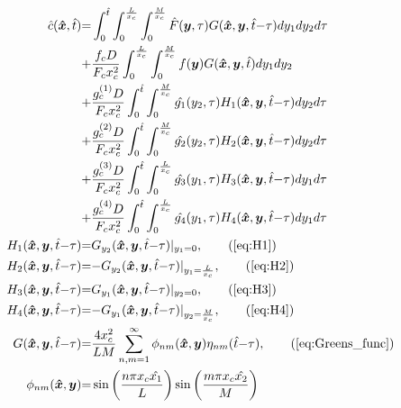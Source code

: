 \documentclass[\main/thesis.tex]{subfiles}
\begin{document}
\begin{align}
\hat{c}(\boldsymbol{\hat{x}}, \hat{t}) &{=} \int_{0}^{\hat{t}} \int_{0}^{\frac{L}{x_c}} \int_{0}^{\frac{M}{x_c}} \hat{F}(\boldsymbol{y}, \tau) G(\boldsymbol{\hat{x}}, \boldsymbol{y}, \hat{t}{-}\tau) dy_1 dy_2 d\tau \nonumber\\
               &{+} \frac{f_c D}{F_c x_c^2} \int_{0}^{\frac{L}{x_c}} \int_{0}^{\frac{M}{x_c}} f(\boldsymbol{y}) G(\boldsymbol{\hat{x}}, \boldsymbol{y}, \hat{t}) dy_1 dy_2 \nonumber\\
               &{+} \frac{g_c^{(1)} D}{F_c x_c^2} \int_{0}^{\hat{t}} \int_{0}^{\frac{M}{x_c}} \hat{g_1}(y_2, \tau) H_1(\boldsymbol{\hat{x}}, \boldsymbol{y}, \hat{t}{-}\tau) dy_2 d\tau \label{eq:carcin_sol}\\
               &{+} \frac{g_c^{(2)} D}{F_c x_c^2} \int_{0}^{\hat{t}} \int_{0}^{\frac{M}{x_c}} \hat{g_2}(y_2, \tau) H_2(\boldsymbol{\hat{x}}, \boldsymbol{y}, \hat{t}{-}\tau) dy_2 d\tau \nonumber\\
               &{+} \frac{g_c^{(3)} D}{F_c x_c^2} \int_{0}^{\hat{t}} \int_{0}^{\frac{L}{x_c}} \hat{g_3}(y_1, \tau) H_3(\boldsymbol{\hat{x}}, \boldsymbol{y}, \hat{t}{-}\tau) dy_1 d\tau \nonumber\\
               &{+} \frac{g_c^{(4)} D}{F_c x_c^2} \int_{0}^{\hat{t}} \int_{0}^{\frac{L}{x_c}} \hat{g_4}(y_1, \tau) H_4(\boldsymbol{\hat{x}}, \boldsymbol{y}, \hat{t}{-}\tau) dy_1 d\tau \nonumber\\
H_1(\boldsymbol{\hat{x}}, \boldsymbol{y}, \hat{t}{-}\tau) &{=} G_{y_2}(\boldsymbol{\hat{x}}, \boldsymbol{y}, \hat{t}{-}\tau) |_{y_1{=}0}, \tag{\ref{eq:H1}}\\
H_2(\boldsymbol{\hat{x}}, \boldsymbol{y}, \hat{t}{-}\tau) &{=} {-} G_{y_2}(\boldsymbol{\hat{x}}, \boldsymbol{y}, \hat{t}{-}\tau) |_{y_1{=}\frac{L}{x_c}}, \tag{\ref{eq:H2}}\\
H_3(\boldsymbol{\hat{x}}, \boldsymbol{y}, \hat{t}{-}\tau) &{=} G_{y_1}(\boldsymbol{\hat{x}}, \boldsymbol{y}, \hat{t}{-}\tau) |_{y_2{=}0}, \tag{\ref{eq:H3}}\\
H_4(\boldsymbol{\hat{x}}, \boldsymbol{y}, \hat{t}{-}\tau) &{=} {-} G_{y_1}(\boldsymbol{\hat{x}}, \boldsymbol{y}, \hat{t}{-}\tau) |_{y_2{=}\frac{M}{x_c}}, \tag{\ref{eq:H4}}\\
G(\boldsymbol{\hat{x}}, \boldsymbol{y}, \hat{t}{-}\tau) &{=} \frac{4 x_c^2}{LM} \sum_{n, m {=} 1}^{\infty} \phi_{nm}(\boldsymbol{\hat{x}}, \boldsymbol{y}) \eta_{nm}(\hat{t}{-}\tau), \tag{\ref{eq:Greens_func}}\\
\phi_{nm}(\boldsymbol{\hat{x}}, \boldsymbol{y}) &{=} \sin\left(\frac{n \pi x_c \hat{x_1}}{L}\right)\sin\left(\frac{m \pi x_c \hat{x_2}}{M}\right)

\end{align}
\end{document}
